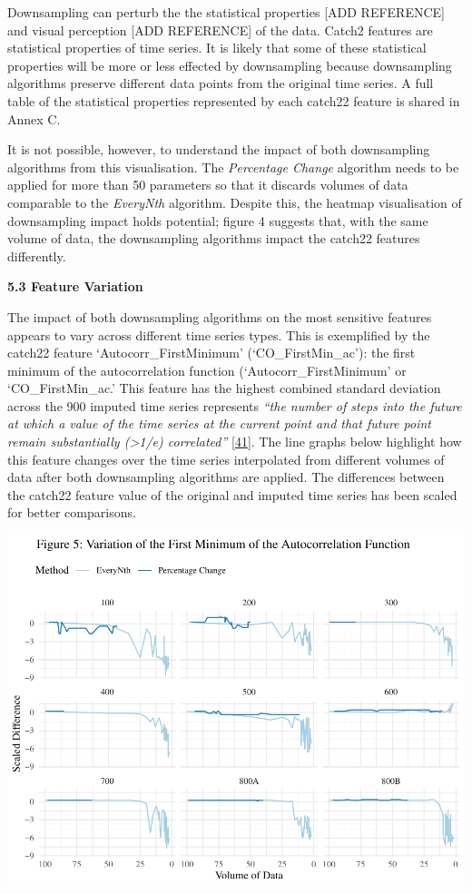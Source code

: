 \documentclass{article}
\begin{document}
Downsampling can perturb the the statistical properties {[}ADD
REFERENCE{]} and visual perception {[}ADD REFERENCE{]} of the data.
Catch2 features are statistical properties of time series. It is likely
that some of these statistical properties will be more or less effected
by downsampling because downsampling algorithms preserve different data
points from the original time series. A full table of the statistical
properties represented by each catch22 feature is shared in Annex C.

It is not possible, however, to understand the impact of both
downsampling algorithms from this visualisation. The \emph{Percentage
Change} algorithm needs to be applied for more than 50 parameters so
that it discards volumes of data comparable to the \emph{EveryNth}
algorithm. Despite this, the heatmap visualisation of downsampling
impact holds potential; figure 4 suggests that, with the same volume of
data, the downsampling algorithms impact the catch22 features
differently.

\textbf{5.3 Feature Variation}

The impact of both downsampling algorithms on the most sensitive
features appears to vary across different time series types. This is
exemplified by the catch22 feature `Autocorr\_FirstMinimum'
(`CO\_FirstMin\_ac'): the first minimum of the autocorrelation function
(`Autocorr\_FirstMinimum' or `CO\_FirstMin\_ac.' This feature has the
highest combined standard deviation across the 900 imputed time series
represents \emph{``the number of steps into the future at which a value
of the time series at the current point and that future point remain
substantially (\textgreater1/e) correlated''}
\protect\hyperlink{ref-feature_book}{{[}41{]}}. The line graphs below
highlight how this feature changes over the time series interpolated
from different volumes of data after both downsampling algorithms are
applied. The differences between the catch22 feature value of the
original and imputed time series has been scaled for better comparisons.

\includegraphics{210431461_CSC8639_Dissertation_files/figure-latex/FirstMinimum-1.pdf}
\end{document}
